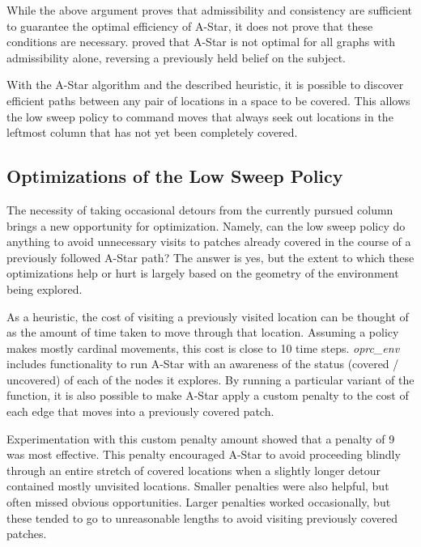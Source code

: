 
While the above argument proves that admissibility and consistency are sufficient to guarantee the optimal efficiency of A-Star, it does not prove that these conditions are necessary. \citeauthor{AStarOpt} proved that A-Star is not optimal for all graphs with admissibility alone, reversing a previously held belief on the subject.

With the A-Star algorithm and the described heuristic, it is possible to discover efficient paths between any pair of locations in a space to be covered. This allows the low sweep policy to command moves that always seek out locations in the leftmost column that has not yet been completely covered. 

\subsection{Optimizations of the Low Sweep Policy}


The necessity of taking occasional detours from the currently pursued column brings a new opportunity for optimization. Namely, can the low sweep policy do anything to avoid unnecessary visits to patches already covered in the course of a previously followed A-Star path? The answer is yes, but the extent to which these optimizations help or hurt is largely based on the geometry of the environment being explored.

As a heuristic, the cost of visiting a previously visited location can be thought of as the amount of time taken to move through that location. Assuming a policy makes mostly cardinal movements, this cost is close to 10 time steps. \textit{oprc\_env} includes functionality to run A-Star with an awareness of the status (covered / uncovered) of each of the nodes it explores. By running a particular variant of the function, it is also possible to make A-Star apply a custom penalty to the cost of each edge that moves into a previously covered patch.

Experimentation with this custom penalty amount showed that a penalty of 9 was most effective. This penalty encouraged A-Star to avoid proceeding blindly through an entire stretch of covered locations when a slightly longer detour contained mostly unvisited locations. Smaller penalties were also helpful, but often missed obvious opportunities. Larger penalties worked occasionally, but these tended to go to unreasonable lengths to avoid visiting previously covered patches.

